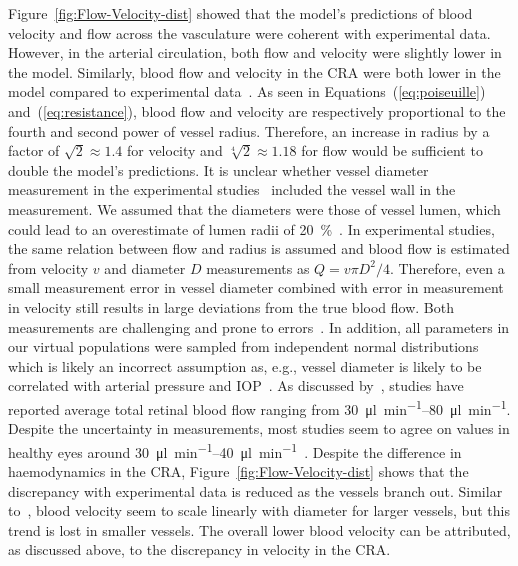 \documentclass[11pt,]{article}
\begin{document}
Figure~\ref{fig:Flow-Velocity-dist} showed that the model's predictions of blood velocity and flow across the vasculature were coherent with experimental data.
However, in the arterial circulation, both flow and velocity were slightly lower in the model\cite{Riva1985,DoblhoffDier2014}.
Similarly, blood flow and velocity in the CRA were both lower in the model compared to experimental data~\cite{DoblhoffDier2014,Riva1985,Dorner2009,Feke_1989}.
As seen in Equations~(\ref{eq:poiseuille}) and~(\ref{eq:resistance}), blood flow and velocity are respectively proportional to the fourth and second power of vessel radius.
Therefore, an increase in radius by a factor of $\sqrt{2}\approx 1.4$ for velocity and $\sqrt[4]{2}\approx 1.18$ for flow would be sufficient to double the model's predictions.
It is unclear whether vessel diameter measurement in the experimental studies~\cite{DoblhoffDier2014,Riva1985} included the vessel wall in the measurement.
We assumed that the diameters were those of vessel lumen, which could lead to an overestimate of lumen radii of \SI{20}{\percent}~\cite{Arichika2016}.
In experimental studies, the same relation between flow and radius is assumed and blood flow is estimated from velocity $v$ and diameter $D$ measurements as $Q=v\pi D^2/4$.
Therefore, even a small measurement error in vessel diameter combined with error in measurement in velocity still results in large deviations from the true blood flow.
Both measurements are challenging and prone to errors~\cite{Leitgeb_2014}.
In addition, all parameters in our virtual populations were sampled from independent normal distributions which is likely an incorrect assumption as, e.g., vessel diameter is likely to be correlated with arterial pressure and IOP~\cite{Dziedziak_2022}.
As discussed by~\cite{DoblhoffDier2014}, studies have reported average total retinal blood flow ranging from \SIrange[per-mode=symbol]{30}{80}{\micro\litre\per\minute}\cite{DoblhoffDier2014,Riva1985,Feke_1989}.
Despite the uncertainty in measurements, most studies seem to agree on values in healthy eyes around \SIrange{30}{40}{\micro\litre\per\minute}~\cite{DoblhoffDier2014,Riva1985}.
Despite the difference in haemodynamics in the CRA, Figure~\ref{fig:Flow-Velocity-dist} shows that the discrepancy with experimental data is reduced as the vessels branch out.
Similar to~\cite{DoblhoffDier2014}, blood velocity seem to scale linearly with diameter for larger vessels, but this trend is lost in smaller vessels.
The overall lower blood velocity can be attributed, as discussed above, to the discrepancy in velocity in the CRA.
\end{document}
